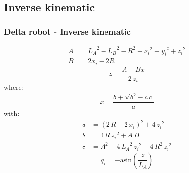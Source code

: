 \subsection{Inverse kinematic}
\begin{frame}
	\frametitle{Delta robot - Inverse kinematic}
	\begin{align}
		A &= {L_{A}}^2-{L_{B}}^2-R^2+{x_{i}}^2+{y_{i}}^2+{z_{i}}^2\\
		B &= 2x_{i}-2R
	\end{align}
	\begin{equation}
		z = \frac{A - Bx}{2\,z_{i}}
	\end{equation}
	where:
	\begin{equation}
		x = \frac{b+\sqrt{b^2-a\,c}}{a}
	\end{equation}
	with:
	\begin{align}
		a &= {\left(2\,R-2\,x_{i}\right)}^2+4\,{z_{i}}^2\\
		b &= 4\,R\,{z_{i}}^2 + A\,B\\
		c &= A^2 - 4\,{L_{A}}^2\,{z_{i}}^2+4\,R^2\,{z_{i}}^2
	\end{align}
	\begin{equation}
		q_i = -\mathrm{asin}\left(\frac{z}{L_{A}}\right)
	\end{equation}
\end{frame}